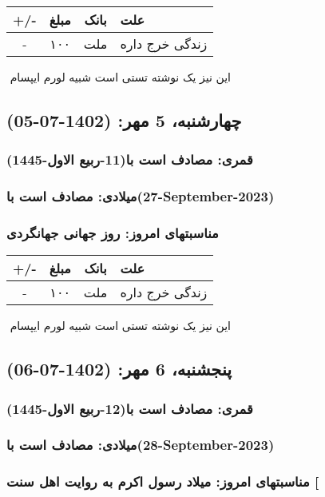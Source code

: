 \documentclass{article}
\newcommand{\rnote}[1]{\marginpar{\textcolor{color}{\StrSubstitute{\##1}{ }{\_}}}}
\newcommand{\myRow}[4]{
    #1 & #2 & #3 & #4 \\ \hline
}
\begin{document}
\begin{tabular}{ | c | c | c | p{5cm} |}
    \hline
    \myRow{ +/- }{مبلغ}{بانک}{علت}
    \myRow{-}{۱۰۰}{ملت}{زندگی خرج داره}
\end{tabular}
\newline
\newline

‌
\rnote{تست}
این نیز یک نوشته تستی است شبیه لورم ایپسام




\newpage
{}
\textcolor{color}{
\section{ چهارشنبه، 5 مهر: (1402-07-05) }
\subsubsection*{قمری: مصادف است با(11-ربیع الاول-1445)} 
\subsubsection*{میلادی: مصادف است با(27-September-2023)}
\subsubsection*{مناسبتهای امروز: روز جهانی جهانگردی}
}


\begin{tabular}{ | c | c | c | p{5cm} |}
    \hline
    \myRow{ +/- }{مبلغ}{بانک}{علت}
    \myRow{-}{۱۰۰}{ملت}{زندگی خرج داره}
\end{tabular}
\newline
\newline

‌
\rnote{تست}
این نیز یک نوشته تستی است شبیه لورم ایپسام




\newpage
{}
\textcolor{color}{
\section{ پنجشنبه، 6 مهر: (1402-07-06) }
\subsubsection*{قمری: مصادف است با(12-ربیع الاول-1445)} 
\subsubsection*{میلادی: مصادف است با(28-September-2023)}
\subsubsection*{مناسبتهای امروز: میلاد رسول اکرم به روایت اهل سنت [}
}
\end{document}

